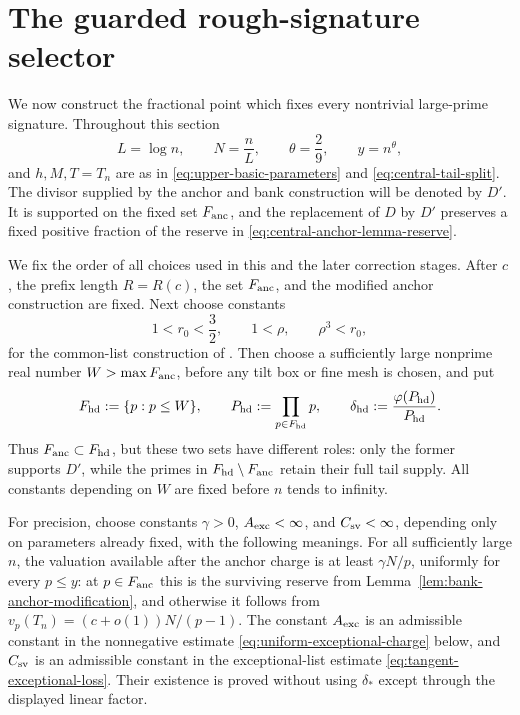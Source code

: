 \documentclass[11pt]{article}
\numberwithin{equation}{section}
\theoremstyle{definition}
\theoremstyle{remark}
\newcommand{\1}{\mathbf 1}
\begin{document}
 \section{The guarded rough-signature selector}
\label{sec:rough-selector}

We now construct the fractional point which fixes every nontrivial large-prime
signature.  Throughout this section
\[
 L=\log n,\qquad N=\frac nL,\qquad \theta=\frac29,
 \qquad y=n^\theta,
\]
and \(h,M,T=T_n\) are as in \eqref{eq:upper-basic-parameters} and
\eqref{eq:central-tail-split}.  The divisor supplied by the anchor and bank
construction will be denoted by \(D'\).  It is supported on the fixed set
\(F_{\rm anc}\), and the replacement of \(D\) by \(D'\) preserves a fixed
positive fraction of the reserve in
\eqref{eq:central-anchor-lemma-reserve}.

We fix the order of all choices used in this and the later correction
stages.  After \(c\), the prefix length \(R=R(c)\), the set
\(F_{\rm anc}\), and the modified anchor construction are fixed.  Next
choose constants
\begin{equation}
              1<r_0<\frac32,\qquad 1<\rho,\qquad \rho^3<r_0,
 \label{eq:global-ratio-parameter-order}
\end{equation}
for the common-list construction of .  Then
choose a sufficiently large nonprime real number
\(W>\max F_{\rm anc}\), before any tilt box or fine mesh is chosen, and
put
\[
 F_{\rm hd}:=\{p:p\le W\},\qquad
 P_{\rm hd}:=\prod_{p\in F_{\rm hd}}p,\qquad
 \delta_{\rm hd}:=\frac{\varphi(P_{\rm hd})}{P_{\rm hd}}.
\]
Thus \(F_{\rm anc}\subset F_{\rm hd}\), but these two sets have different
roles: only the former supports \(D'\), while the primes in
\(F_{\rm hd}\setminus F_{\rm anc}\) retain their full tail supply.  All
constants depending on \(W\) are fixed before \(n\) tends to infinity.

For precision, choose constants \(\gamma>0\), \(A_{\rm exc}<\infty\), and
\(C_{\rm sv}<\infty\), depending only on parameters already fixed, with
the following meanings.  For all sufficiently large \(n\), the valuation
available after the anchor charge is at least \(\gamma N/p\), uniformly
for every \(p\le y\): at \(p\in F_{\rm anc}\) this is the surviving
reserve from Lemma~\ref{lem:bank-anchor-modification}, and otherwise it follows
from \(v_p(T_n)=(c+o(1))N/(p-1)\).  The constant \(A_{\rm exc}\) is an
admissible constant in the nonnegative estimate
\eqref{eq:uniform-exceptional-charge} below, and \(C_{\rm sv}\) is an
admissible constant in the exceptional-list estimate
\eqref{eq:tangent-exceptional-loss}.  Their existence is proved without
using \(\delta_*\) except through the displayed linear factor.
\end{document}
